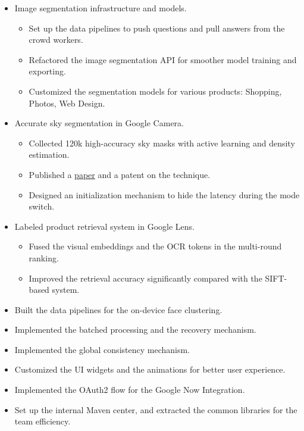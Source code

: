 \documentclass[letterpaper,11pt]{article}
\begin{document}
\begin{itemize}
  \begin{itemize}
    
    \item Image segmentation infrastructure and models.
    \begin{itemize}
      \item Set up the data pipelines to push questions and pull answers from the crowd workers.
      \item Refactored the image segmentation API for smoother model training and exporting.
      \item Customized the segmentation models for various products: Shopping, Photos, Web Design.
    \end{itemize}
    
    \item Accurate sky segmentation in Google Camera.
    \begin{itemize}
      \item Collected 120k high-accuracy sky masks with active learning and density estimation.
      \item Published a \href{https://google.github.io/sky-optimization/}{paper} and a patent on the technique.
      \item Designed an initialization mechanism to hide the latency during the mode switch.
    \end{itemize}
    
    \item Labeled product retrieval system in Google Lens.
    \begin{itemize}
      \item Fused the visual embeddings and the OCR tokens in the multi-round ranking.
      \item Improved the retrieval accuracy significantly compared with the SIFT-based system.
    \end{itemize}
  \end{itemize}

  \begin{itemize}
  \item Built the data pipelines for the on-device face clustering.
  \item Implemented the batched processing and the recovery mechanism.
  \item Implemented the global consistency mechanism.
  \end{itemize}

  \begin{itemize}
  \item Customized the UI widgets and the animations for better user experience.
  \item Implemented the OAuth2 flow for the Google Now Integration.
  \item Set up the internal Maven center, and extracted the common libraries for the team efficiency.
  \end{itemize}
\end{itemize}
\end{document}
